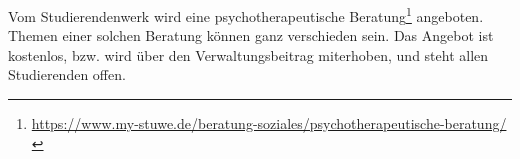 Vom Studierendenwerk wird eine psychotherapeutische Beratung\footnote{\url{https://www.my-stuwe.de/beratung-soziales/psychotherapeutische-beratung/}} angeboten. Themen einer solchen Beratung können ganz verschieden sein. Das Angebot ist kostenlos, bzw. wird über den Verwaltungsbeitrag miterhoben, und steht allen Studierenden offen.	%